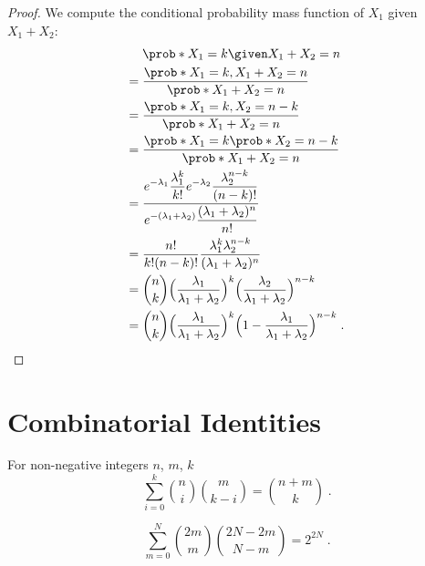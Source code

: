 \begin{proof}
We compute the conditional probability mass function of $X_1$ given $X_1+X_2$:
\begingroup
\addtolength{\jot}{1em}
\begin{align*}
    & \prob*{X_1=k\given X_1+X_2=n}\\
={} & \frac{\prob*{X_1=k,X_1+X_2=n}}{\prob*{X_1+X_2=n}}\\
={} & \frac{\prob*{X_1=k,X_2=n-k}}{\prob*{X_1+X_2=n}}\\
={} & \frac{\prob*{X_1=k}\prob*{X_2=n-k}}{\prob*{X_1+X_2=n}}\\
={} & \frac{\displaystyle
e^{-\lambda_1}\frac{\lambda_1^{k  }}{k!    } 
e^{-\lambda_2}\frac{\lambda_2^{n-k}}{(n-k)!}
}
{\displaystyle
e^{-(\lambda_1+\lambda_2)}\frac{(\lambda_1+\lambda_2)^n}{n!}
} \\
={} & \frac{n!}{k!(n-k)!}\frac{\lambda_1^k\lambda_2^{n-k}}{(\lambda_1+\lambda_2)^{n}} \\
={} & \binom{n}{k}\Bigl(\frac{\lambda_1}{\lambda_1+\lambda_2}\Bigr)^k
\Bigl(\frac{\lambda_2}{\lambda_1+\lambda_2}\Bigr)^{n-k}\\
={} & \binom{n}{k}\Bigl(\frac{\lambda_1}{\lambda_1+\lambda_2}\Bigr)^k
\Bigl(1-\frac{\lambda_1}{\lambda_1+\lambda_2}\Bigr)^{n-k}\;.
\end{align*}    
\endgroup
\end{proof}

\chapter{Combinatorial Identities}

\begin{fact}
For non-negative integers $n$, $m$, $k$
\[
\sum_{i=0}^{k} \binom{n}{i}\binom{m}{k-i} = \binom{n+m}{k} \;.
\]
\end{fact}

\begin{fact}
\[
\sum_{m=0}^{N} \binom{2m}{m}\binom{2N-2m}{N-m} = 2^{2N}\;.
\]    
\end{fact}
